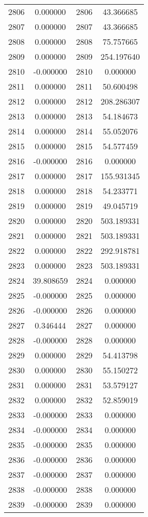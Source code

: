 \documentclass[12pt]{article}
\begin{document}
\begin{longtable}{@{}cccc@{}}
2806 & 0.000000 & 2806 & 43.366685 \\
2807 & 0.000000 & 2807 & 43.366685 \\
2808 & 0.000000 & 2808 & 75.757665 \\
2809 & 0.000000 & 2809 & 254.197640 \\
2810 & -0.000000 & 2810 & 0.000000 \\
2811 & 0.000000 & 2811 & 50.600498 \\
2812 & 0.000000 & 2812 & 208.286307 \\
2813 & 0.000000 & 2813 & 54.184673 \\
2814 & 0.000000 & 2814 & 55.052076 \\
2815 & 0.000000 & 2815 & 54.577459 \\
2816 & -0.000000 & 2816 & 0.000000 \\
2817 & 0.000000 & 2817 & 155.931345 \\
2818 & 0.000000 & 2818 & 54.233771 \\
2819 & 0.000000 & 2819 & 49.045719 \\
2820 & 0.000000 & 2820 & 503.189331 \\
2821 & 0.000000 & 2821 & 503.189331 \\
2822 & 0.000000 & 2822 & 292.918781 \\
2823 & 0.000000 & 2823 & 503.189331 \\
2824 & 39.808659 & 2824 & 0.000000 \\
2825 & -0.000000 & 2825 & 0.000000 \\
2826 & -0.000000 & 2826 & 0.000000 \\
2827 & 0.346444 & 2827 & 0.000000 \\
2828 & -0.000000 & 2828 & 0.000000 \\
2829 & 0.000000 & 2829 & 54.413798 \\
2830 & 0.000000 & 2830 & 55.150272 \\
2831 & 0.000000 & 2831 & 53.579127 \\
2832 & 0.000000 & 2832 & 52.859019 \\
2833 & -0.000000 & 2833 & 0.000000 \\
2834 & -0.000000 & 2834 & 0.000000 \\
2835 & -0.000000 & 2835 & 0.000000 \\
2836 & -0.000000 & 2836 & 0.000000 \\
2837 & -0.000000 & 2837 & 0.000000 \\
2838 & -0.000000 & 2838 & 0.000000 \\
2839 & -0.000000 & 2839 & 0.000000 \\

\end{longtable}
\end{document}
